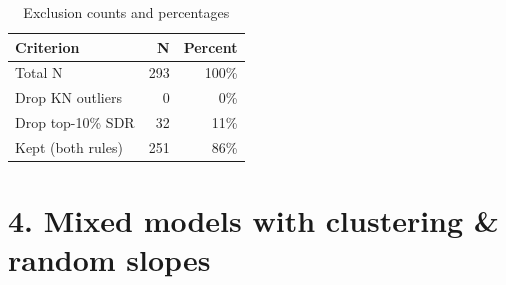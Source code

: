 \documentclass[
  10pt,
]{article}
\begin{document}
\begin{table}[t]
\caption*{
{\fontsize{20}{25}\selectfont  Exclusion counts and percentages\fontsize{12}{15}\selectfont }
}
\fontsize{12.0pt}{14.0pt}\selectfont
\begin{tabular*}{\linewidth}{@{\extracolsep{\fill}}lrr}
\toprule
Criterion & N & Percent \\
\midrule\addlinespace[2.5pt]
Total N & 293 & 100\% \\
Drop KN outliers & 0 & 0\% \\
Drop top-10\% SDR & 32 & 11\% \\
Kept (both rules) & 251 & 86\% \\
\bottomrule
\end{tabular*}
\end{table}

\hypertarget{mixed-models-with-clustering-random-slopes}{%
\section{4. Mixed models with clustering \& random
slopes}\label{mixed-models-with-clustering-random-slopes}}
\end{document}
